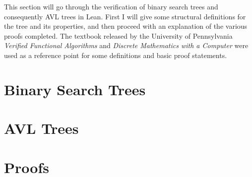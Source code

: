 This section will go through the verification of binary search trees 
and consequently AVL trees in Lean. First I will give some structural definitions for the tree and its properties, 
and then proceed with an explanation of the various proofs completed. 
The textbook released by the University of Pennsylvania \textit{Verified Functional Algorithms} \cite{bst:upenn}
and \textit{Discrete Mathematics with a Computer} \cite{avl:computer} were used as a reference point for some definitions and basic proof statements.

\section{Binary Search Trees}


\section{AVL Trees}


\section{Proofs}

